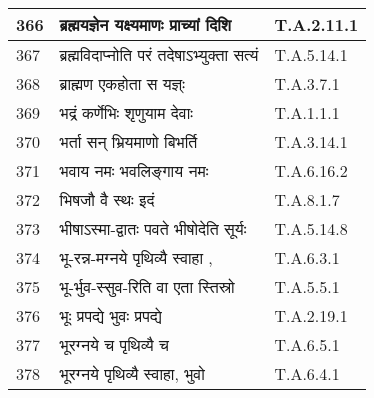 \documentclass[17pt]{extarticle}
\begin{document}
\begin{longtable}{||p{0.4in}||p{4.9in}||p{0.9in}||}
    \hline
        
    366 & ब्रह्मयज्ञेन यक्ष्यमाणः प्राच्यां दिशि & T.A.2.11.1       \\
    
    \hline
        
    367 & ब्रह्मविदाप्नोति परं तदेषाऽभ्युक्ता सत्यं & T.A.5.14.1       \\
    
    \hline
        
    368 & ब्राह्मण एकहोता स यज्ञ्ः & T.A.3.7.1       \\
    
    \hline
        
    369 & भद्रं कर्णेभिः शृणुयाम देवाः & T.A.1.1.1       \\
    
    \hline
        
    370 & भर्ता सन् भ्रियमाणो बिभर्ति & T.A.3.14.1       \\
    
    \hline
        
    371 & भवाय नमः भवलिङ्गाय नमः & T.A.6.16.2       \\
    
    \hline
        
    372 & भिषजौ वै स्थः इदं & T.A.8.1.7       \\
    
    \hline
        
    373 & भीषाऽस्मा{-}द्वातः पवते भीषोदेति सूर्यः & T.A.5.14.8       \\
    
    \hline
        
    374 & भू{-}रन्न{-}मग्नये पृथिव्यै स्वाहा , & T.A.6.3.1       \\
    
    \hline
        
    375 & भू{-}र्भुव{-}स्सुव{-}रिति वा एता स्तिस्रो & T.A.5.5.1       \\
    
    \hline
        
    376 & भूः प्रपद्ये भुवः प्रपद्ये & T.A.2.19.1       \\
    
    \hline
        
    377 & भूरग्नये च पृथिव्यै च & T.A.6.5.1       \\
    
    \hline
        
    378 & भूरग्नये पृथिव्यै स्वाहा, भुवो & T.A.6.4.1       \\
    

\end{longtable}
\end{document}
